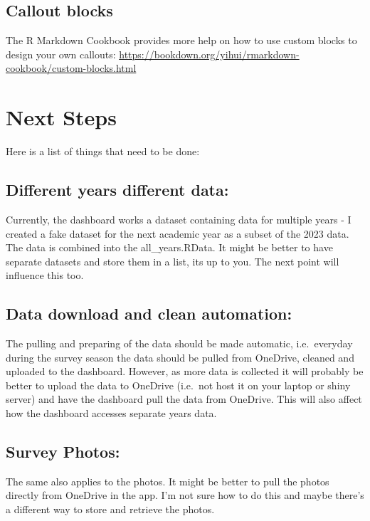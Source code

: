 \documentclass[
]{book}
\theoremstyle{definition}
\theoremstyle{definition}
\theoremstyle{definition}
\theoremstyle{definition}
\theoremstyle{remark}
\begin{document}
\hypertarget{callout-blocks}{%
\section{Callout blocks}\label{callout-blocks}}

The R Markdown Cookbook provides more help on how to use custom blocks to design your own callouts: \url{https://bookdown.org/yihui/rmarkdown-cookbook/custom-blocks.html}

\hypertarget{next-steps}{%
\chapter{Next Steps}\label{next-steps}}

Here is a list of things that need to be done:

\hypertarget{different-years-different-data}{%
\section{Different years different data:}\label{different-years-different-data}}

Currently, the dashboard works a dataset containing data for multiple years - I created a fake dataset for the next academic year as a subset of the 2023 data. The data is combined into the all\_years.RData. It might be better to have separate datasets and store them in a list, its up to you. The next point will influence this too.

\hypertarget{data-download-and-clean-automation}{%
\section{Data download and clean automation:}\label{data-download-and-clean-automation}}

The pulling and preparing of the data should be made automatic, i.e.~everyday during the survey season the data should be pulled from OneDrive, cleaned and uploaded to the dashboard. However, as more data is collected it will probably be better to upload the data to OneDrive (i.e.~not host it on your laptop or shiny server) and have the dashboard pull the data from OneDrive. This will also affect how the dashboard accesses separate years data.

\hypertarget{survey-photos}{%
\section{Survey Photos:}\label{survey-photos}}

The same also applies to the photos. It might be better to pull the photos directly from OneDrive in the app. I'm not sure how to do this and maybe there's a different way to store and retrieve the photos.

  
\end{document}
